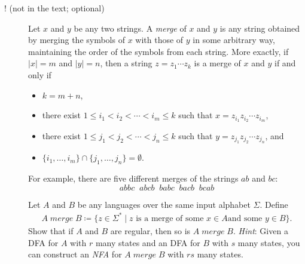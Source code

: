 \documentclass[11pt]{article}
\newcommand{\merge}[2]{{{#1}\mathop{\textit{merge}}{#2}}}
\theoremstyle{plain}
\theoremstyle{definition}
\begin{document}
\begin{description}
\item[! (not in the text; optional)]
  Let $x$ and $y$ be any two strings.  A \emph{merge} of $x$
  and $y$ is any string obtained by merging the symbols of $x$ with
  those of $y$ in some arbitrary way, maintaining the order of the
  symbols from each string.  More exactly, if $|x|=m$ and $|y|=n$,
  then a string $z = z_1\cdots z_k$ is a merge of $x$ and $y$ if and
  only if
  \begin{itemize}
    \item $k = m+n$,
    \item there exist $1\le i_1<i_2<\cdots<i_m\le k$ such that $x =
      z_{i_1}z_{i_2}\cdots z_{i_m}$,
    \item there exist $1\le j_1<j_2<\cdots<j_n\le k$ such that $y =
      z_{j_1}z_{j_2}\cdots z_{j_n}$, and
    \item $\{i_1,\ldots,i_m\} \cap \{j_1,\ldots,j_n\} = \emptyset$.
  \end{itemize}
  For example, there are five different merges of the strings $ab$ and
  $bc$:
  \[ abbc \;\; abcb \;\; babc \;\; bacb \;\; bcab \]

  Let $A$ and $B$ be any languages over the same input alphabet
  $\Sigma$.  Define
  \begin{align*}
    \merge{A}{B} \coloneqq \{ z\in\Sigma^* \mid \mbox{$z$ is a merge of some $x\in A$
and some $y\in B$} \}.
\end{align*}
  Show that if $A$ and $B$ are regular, then so is $\merge{A}{B}$.
  \emph{Hint}: Given a DFA for $A$ with $r$ many states and an DFA for
  $B$ with $s$ many states, you can construct an \emph{NFA} for $\merge{A}{B}$
  with $rs$ many states.

\end{description}
\end{document}
